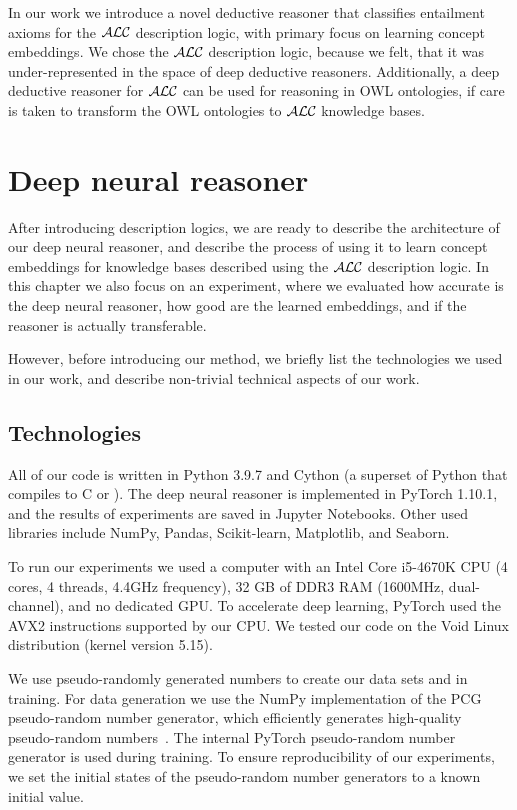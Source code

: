In our work we introduce a novel deductive reasoner that classifies entailment axioms for the $\mathcal{ALC}$ description logic, with primary focus on learning concept embeddings.
We chose the $\mathcal{ALC}$ description logic, because we felt, that it was under-represented in the space of deep deductive reasoners.
Additionally, a deep deductive reasoner for $\mathcal{ALC}$ can be used for reasoning in OWL ontologies, if care is taken to transform the OWL ontologies to $\mathcal{ALC}$ knowledge bases.


\chapter{Deep neural reasoner} %
\label{chap:reasoneur}

After introducing description logics, we are ready to describe the architecture of our deep neural reasoner, and describe the process of using it to learn concept embeddings for knowledge bases described using the $\mathcal{ALC}$ description logic.
In this chapter we also focus on an experiment, where we evaluated how accurate is the deep neural reasoner, how good are the learned embeddings, and if the reasoner is actually transferable.

However, before introducing our method, we briefly list the technologies we used in our work, and describe non-trivial technical aspects of our work.

\section{Technologies}
\label{sec:technologies}

All of our code is written in Python 3.9.7 and Cython (a superset of Python that compiles to C or \cpp{}).
The deep neural reasoner is implemented in PyTorch 1.10.1, and the results of experiments are saved in Jupyter Notebooks.
Other used libraries include NumPy, Pandas, Scikit-learn, Matplotlib, and Seaborn.

To run our experiments we used a computer with an Intel Core i5-4670K CPU (4 cores, 4 threads, 4.4GHz frequency), 32 GB of DDR3 RAM (1600MHz, dual-channel), and no dedicated GPU.
To accelerate deep learning, PyTorch used the AVX2 instructions supported by our CPU.
We tested our code on the Void Linux distribution (kernel version 5.15).

We use pseudo-randomly generated numbers to create our data sets and in training.
For data generation we use the NumPy implementation of the PCG pseudo-random number generator, which efficiently generates high-quality pseudo-random numbers~\cite{oneill_pcg_2014}.
The internal PyTorch pseudo-random number generator is used during training.
To ensure reproducibility of our experiments, we set the initial states of the pseudo-random number generators to a known initial value.

